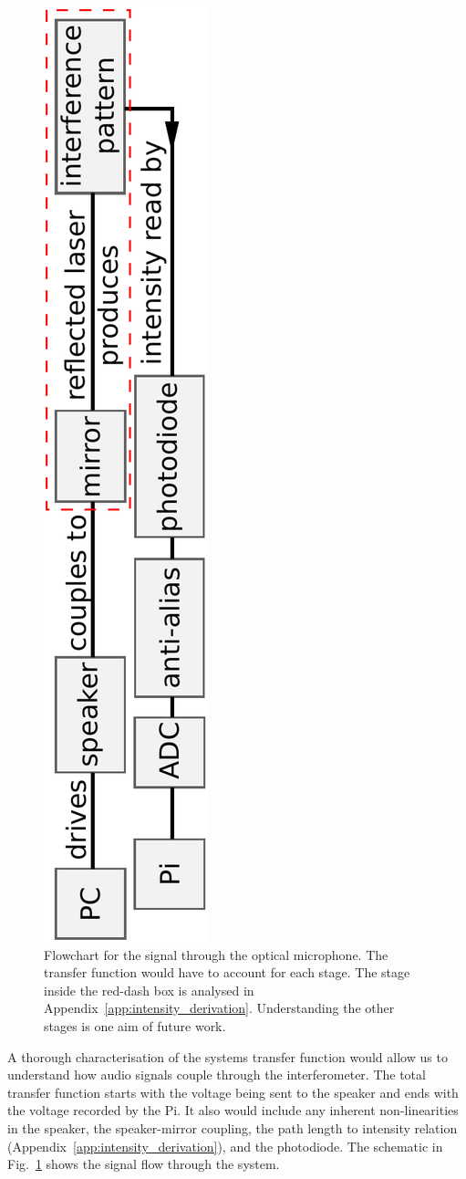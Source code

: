 \documentclass[paper-main.tex]{subfiles}
\begin{document}
\begin{figure}
	\includegraphics[height=.8\textwidth, angle=-90]{figures/pipeline.pdf}
	\caption{
Flowchart for the signal through the optical microphone. The transfer function would have to account for each stage. 
The stage inside the red-dash box is analysed in Appendix~\ref{app:intensity_derivation}. Understanding the other stages is one aim of future work. 
}
	\label{fig:pipeline_highlighted}
\end{figure}

A thorough characterisation of the systems transfer function would allow us to understand how audio signals couple through the interferometer. 
The total transfer function starts with the voltage being sent to the speaker and ends with the voltage recorded by the Pi. It also would include any inherent non-linearities in the speaker, the speaker-mirror coupling, the path length to intensity relation (Appendix~\ref{app:intensity_derivation}), and the photodiode. The schematic in Fig.~\ref{fig:pipeline_highlighted} shows the signal flow through the system.
\end{document}
